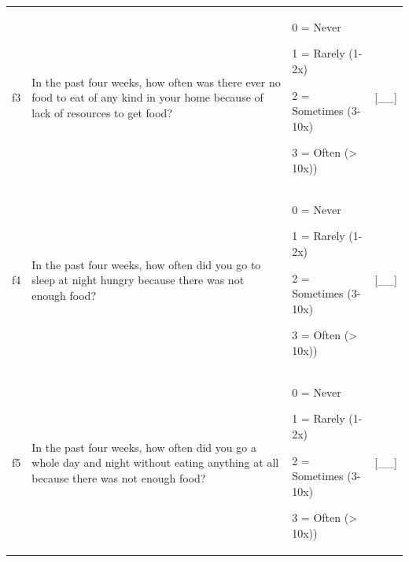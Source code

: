 \documentclass[12pt,a4paper]{book}
\theoremstyle{definition}
\theoremstyle{definition}
\theoremstyle{definition}
\theoremstyle{remark}
\begin{document}
\begin{longtable}[]{@{}llll@{}}
\toprule
\begin{minipage}[t]{0.24\columnwidth}\raggedright
f3\strut
\end{minipage} & \begin{minipage}[t]{0.24\columnwidth}\raggedright
In the past four weeks, how often was there ever no food to eat of any
kind in your home because of lack of resources to get food?\strut
\end{minipage} & \begin{minipage}[t]{0.24\columnwidth}\raggedright
0 = Never

1 = Rarely (1-2x)

2 = Sometimes (3-10x)

3 = Often (\textgreater{} 10x))\strut
\end{minipage} & \begin{minipage}[t]{0.24\columnwidth}\raggedright
{[}\_\_{]}\strut
\end{minipage}\tabularnewline
\begin{minipage}[t]{0.24\columnwidth}\raggedright
f4\strut
\end{minipage} & \begin{minipage}[t]{0.24\columnwidth}\raggedright
In the past four weeks, how often did you go to sleep at night hungry
because there was not enough food?\strut
\end{minipage} & \begin{minipage}[t]{0.24\columnwidth}\raggedright
0 = Never

1 = Rarely (1-2x)

2 = Sometimes (3-10x)

3 = Often (\textgreater{} 10x))\strut
\end{minipage} & \begin{minipage}[t]{0.24\columnwidth}\raggedright
{[}\_\_{]}\strut
\end{minipage}\tabularnewline
\begin{minipage}[t]{0.24\columnwidth}\raggedright
f5\strut
\end{minipage} & \begin{minipage}[t]{0.24\columnwidth}\raggedright
In the past four weeks, how often did you go a whole day and night
without eating anything at all because there was not enough food?\strut
\end{minipage} & \begin{minipage}[t]{0.24\columnwidth}\raggedright
0 = Never

1 = Rarely (1-2x)

2 = Sometimes (3-10x)

3 = Often (\textgreater{} 10x))\strut
\end{minipage} & \begin{minipage}[t]{0.24\columnwidth}\raggedright
{[}\_\_{]}\strut
\end{minipage}\tabularnewline
\bottomrule
\end{longtable}
\end{document}
